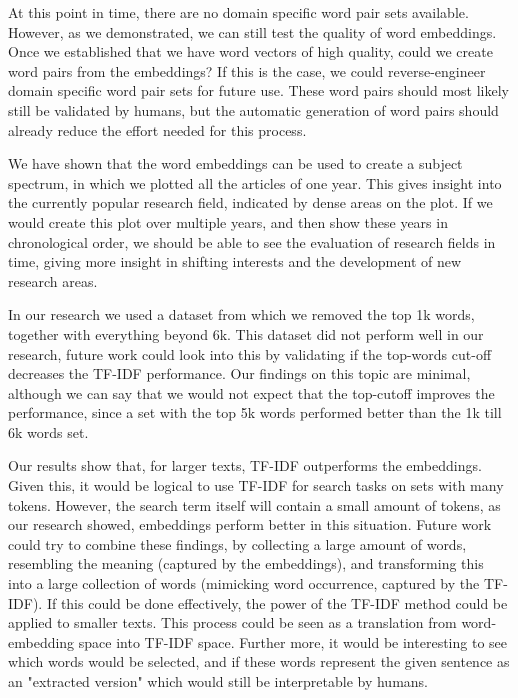 \documentclass[../../Thesis.tex]{subfiles}
\begin{document}
At this point in time, there are no domain specific word pair sets available. However, as we demonstrated, we can still test the quality of word embeddings. Once we established that we have word vectors of high quality, could we create word pairs from the embeddings? If this is the case, we could reverse-engineer domain specific word pair sets for future use. These word pairs should most likely still be validated by humans, but the automatic generation of word pairs should already reduce the effort needed for this process.

We have shown that the word embeddings can be used to create a subject spectrum, in which we plotted all the articles of one year. This gives insight into the currently popular research field, indicated by dense areas on the plot. If we would create this plot over multiple years, and then show these years in chronological order, we should be able to see the evaluation of research fields in time, giving more insight in shifting interests and the development of new research areas.

In our research we used a dataset from which we removed the top 1k words, together with everything beyond 6k. This dataset did not perform well in our research, future work could look into this by validating if the top-words cut-off decreases the TF-IDF performance. Our findings on this topic are minimal, although we can say that we would not expect that the top-cutoff improves the performance, since a set with the top 5k words performed better than the 1k till 6k words set.

Our results show that, for larger texts, TF-IDF outperforms the embeddings. Given this, it would be logical to use TF-IDF for search tasks on sets with many tokens. However, the search term itself will contain a small amount of tokens, as our research showed, embeddings perform better in this situation. Future work could try to combine these findings, by collecting a large amount of words, resembling the meaning (captured by the embeddings), and transforming this into a large collection of words (mimicking word occurrence, captured by the TF-IDF). If this could be done effectively, the power of the TF-IDF method could be applied to smaller texts. This process could be seen as a translation from word-embedding space into TF-IDF space. Further more, it would be interesting to see which words would be selected, and if these words represent the given sentence as an "extracted version" which would still be interpretable by humans.
\end{document}
